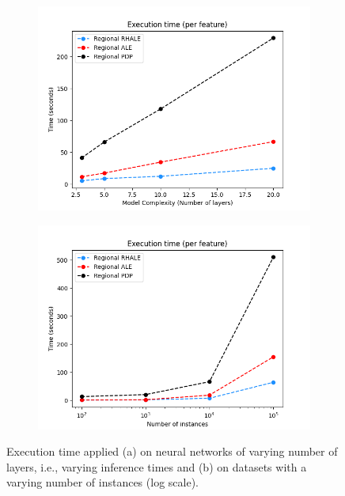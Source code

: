 \documentclass[
twocolumn,
]{ceurart}
\begin{document}
\begin{figure}
  \centering
  \begin{subfigure}[t]{0.24\textwidth}
  \centering
  \includegraphics[width=\linewidth]{figures/simulation_2/efficiency_layers.png}
  \caption{}
  \label{fig:efficiency_heavy_model}
  \end{subfigure}
  \begin{subfigure}[t]{0.24\textwidth}
  \centering
  \includegraphics[width=\linewidth]{figures/simulation_2/efficiency_samples.png}
  \caption{}
  \label{fig:efficiency_nof_instances}
  \end{subfigure}
  \caption{Execution time applied (a) on neural networks of varying number of layers, i.e., varying inference times and (b) on datasets with a varying number of instances (log scale).}
\end{figure}
\end{document}
